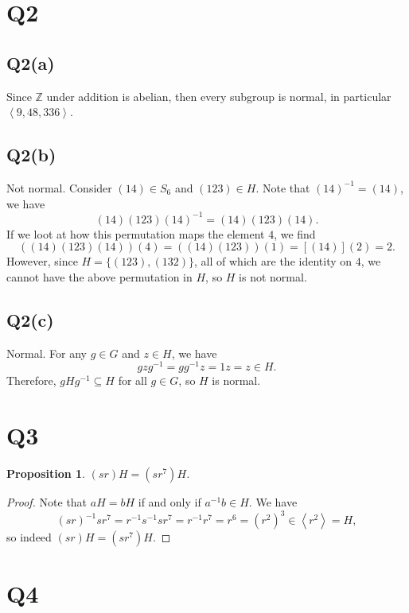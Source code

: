 \documentclass[12pt]{article}
\newtheorem{proposition}{Proposition}
\newcommand{\Z}{\mathbb{Z}} %
\newcommand{\<}{\left\langle} %
\renewcommand{\>}{\right\rangle} %
\begin{document}
\section*{Q2}

\subsection*{Q2(a)}

Since $\Z$ under addition is abelian, then every subgroup is normal, in particular $\<9, 48, 336\>$.

\subsection*{Q2(b)}

Not normal. Consider $(14)\in S_6$ and $(123)\in H$. Note that $(14)^{-1}=(14)$, we have
\[(14)(123)(14)^{-1} = (14)(123)(14).\]
If we loot at how this permutation maps the element $4$, we find
\[((14)(123)(14))(4) = ((14)(123))(1) = [(14)](2) = 2.\]
However, since $H=\{(123),(132)\}$, all of which are the identity on $4$, we cannot have the above permutation in $H$, so $H$ is not normal.

\subsection*{Q2(c)}

Normal. For any $g\in G$ and $z\in H$, we have
\[gzg^{-1} = gg^{-1}z = 1z = z \in H.\]
Therefore, $gHg^{-1} \subseteq H$ for all $g\in G$, so $H$ is normal.

\newpage
\section*{Q3}

\begin{proposition}
    $(sr)H = (sr^7)H$.
\end{proposition}

\begin{proof}
    Note that $aH = bH$ if and only if $a^{-1}b \in H$. We have
    \[(sr)^{-1}sr^7 = r^{-1}s^{-1}sr^7 = r^{-1}r^{7} = r^6 = (r^2)^3 \in \<r^2\> = H,\]
    so indeed $(sr)H = (sr^7)H$.
    
\end{proof}

\newpage
\section*{Q4}
\end{document}
